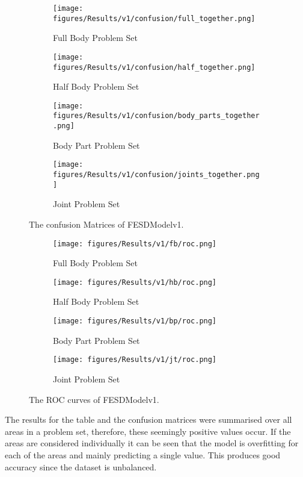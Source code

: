 \begin{figure}[ht]
  \centering
  \begin{subfigure}[b]{0.47\linewidth}
      \centering
      \texttt{[image: figures/Results/v1/confusion/full\_together.png]}
      \caption[]{Full Body Problem Set}
      \label{fig:fb_conf_v1}
  \end{subfigure}
  \hfill
  \begin{subfigure}[b]{0.47\linewidth}
      \centering
      \texttt{[image: figures/Results/v1/confusion/half\_together.png]}
      \caption[]{Half Body Problem Set}
      \label{fig:hb_conf_v1}
  \end{subfigure}
  \hfill
  \begin{subfigure}[b]{0.47\linewidth}
      \centering
      \texttt{[image: figures/Results/v1/confusion/body\_parts\_together.png]}
      \caption[]{Body Part Problem Set}
      \label{fig:bp_conf_v1}
  \end{subfigure}
  \hfill
  \begin{subfigure}[b]{0.47\linewidth}
      \centering
      \texttt{[image: figures/Results/v1/confusion/joints\_together.png]}
      \caption[]{Joint Problem Set}
      \label{fig:jt_conf_v1}
  \end{subfigure}
  \caption[Confusion Matrices of FESDModelv1]{The confusion Matrices of FESDModelv1.}
  \label{fig:conf_v1}
\end{figure}

\begin{figure}
  \centering
  \begin{subfigure}[b]{0.47\linewidth}
      \centering
      \texttt{[image: figures/Results/v1/fb/roc.png]}
      \caption[]{Full Body Problem Set}
      \label{fig:fb_roc_v1}
  \end{subfigure}
  \hfill
  \begin{subfigure}[b]{0.47\linewidth}
      \centering
      \texttt{[image: figures/Results/v1/hb/roc.png]}
      \caption[]{Half Body Problem Set}
      \label{fig:hb_roc_v1}
  \end{subfigure}
  \hfill
  \begin{subfigure}[b]{0.47\linewidth}
      \centering
      \texttt{[image: figures/Results/v1/bp/roc.png]}
      \caption[]{Body Part Problem Set}
      \label{fig:bp_roc_v1}
  \end{subfigure}
  \hfill
  \begin{subfigure}[b]{0.47\linewidth}
      \centering
      \texttt{[image: figures/Results/v1/jt/roc.png]}
      \caption[]{Joint Problem Set}
      \label{fig:jt_roc_v1}
  \end{subfigure}
  \caption[ROC Curves of FESDModelv1]{The ROC curves of FESDModelv1.}
  \label{fig:roc_v1}
\end{figure}

The results for the table and the confusion matrices were summarised over all areas in a problem set, therefore, these seemingly positive values occur. If the areas are considered individually it can be seen that the model is overfitting for each of the areas and mainly predicting a single value. This produces good accuracy since the dataset is unbalanced.